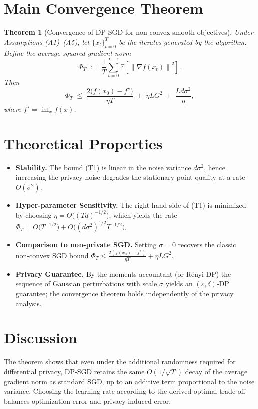 \documentclass{article}
\newtheorem{theorem}{Theorem}
\newcommand{\EE}{\mathbb{E}}
\newcommand{\norm}[1]{\left\lVert #1 \right\rVert}
\begin{document}
\section*{Main Convergence Theorem}
\begin{theorem}[Convergence of DP‑SGD for non‑convex smooth objectives]\label{thm:main}
Under Assumptions (A1)–(A5), let $\{x_{t}\}_{t=0}^{T}$ be the iterates generated by the
algorithm. Define the average squared gradient norm
\[
\Phi_{T}\;:=\;\frac{1}{T}\sum_{t=0}^{T-1}\EE\!\left[\norm{\nabla f(x_{t})}^{2}\right].
\]
Then
\[
\boxed{
\Phi_{T}\;\le\;
\frac{2\bigl(f(x_{0})-f^{\star}\bigr)}{\eta T}
\;+\;
\eta L G^{2}
\;+\;
\frac{L d\sigma^{2}}{\eta},
}
\tag{T1}
\]
where $f^{\star}=\inf_{x}f(x)$.
\end{theorem}

\section*{Theoretical Properties}
\begin{itemize}
\item \textbf{Stability.} The bound (T1) is linear in the noise variance $d\sigma^{2}$,
hence increasing the privacy noise degrades the stationary‑point quality at a rate
$O(\sigma^{2})$.
\item \textbf{Hyper‑parameter Sensitivity.}
  The right‑hand side of (T1) is minimized by choosing $\eta=\Theta\bigl((Td)^{-1/2}\bigr)$,
  which yields the rate
  $\Phi_{T}=O\!\bigl(T^{-1/2}\bigr)+O\!\bigl((d\sigma^{2})^{1/2}T^{-1/2}\bigr)$.
\item \textbf{Comparison to non‑private SGD.}
  Setting $\sigma=0$ recovers the classic non‑convex SGD bound
  $\Phi_{T}\le \frac{2(f(x_{0})-f^{\star})}{\eta T}+ \eta L G^{2}$.
\item \textbf{Privacy Guarantee.}
  By the moments accountant (or Rényi DP) the sequence of Gaussian perturbations with
  scale $\sigma$ yields an $(\varepsilon,\delta)$‑DP guarantee; the convergence theorem
  holds independently of the privacy analysis.
\end{itemize}

\section*{Discussion}
The theorem shows that even under the additional randomness required for differential
privacy, DP‑SGD retains the same $O(1/\sqrt{T})$ decay of the average gradient norm as
standard SGD, up to an additive term proportional to the noise variance.
Choosing the learning rate according to the derived optimal trade‑off balances
optimization error and privacy‑induced error.
\end{document}
